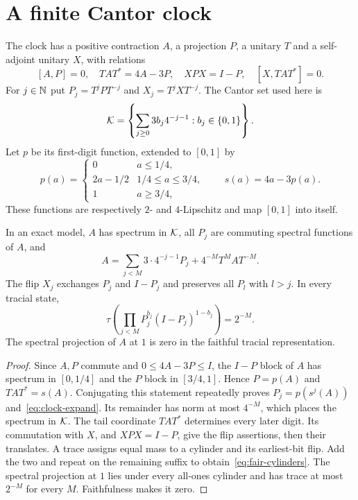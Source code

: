 \section{A finite Cantor clock}\label{sec:clock}
The clock has a positive contraction $A$, a projection $P$, a unitary $T$ and a self-adjoint unitary $X$, with relations
\begin{equation}\label{eq:clock}
 [A,P]=0,\quad TAT^*=4A-3P,\quad XPX=I-P,\quad [X,TAT^*]=0.
\end{equation}
For $j\in\mathbb N$ put $P_j=T^jPT^{-j}$ and $X_j=T^jXT^{-j}$. The Cantor set used here is
\[
 \mathcal K=\left\{\sum_{j\ge0}3b_j4^{-j-1}:b_j\in\{0,1\}\right\}.
\]
Let $p$ be its first-digit function, extended to $[0,1]$ by
\[
 p(a)=\begin{cases}0&a\le1/4,\\2a-1/2&1/4\le a\le3/4,\\1&a\ge3/4,\end{cases}
 \qquad s(a)=4a-3p(a).
\]
These functions are respectively $2$- and $4$-Lipschitz and map $[0,1]$ into itself.

\begin{lemma}\label{lem:exact-clock}
In an exact model, $A$ has spectrum in $\mathcal K$, all $P_j$ are commuting spectral functions of $A$, and
\begin{equation}\label{eq:clock-expand}
 A=\sum_{j<M}3\cdot4^{-j-1}P_j+4^{-M}T^MAT^{-M}.
\end{equation}
The flip $X_j$ exchanges $P_j$ and $I-P_j$ and preserves all $P_l$ with $l>j$. In every tracial state,
\begin{equation}\label{eq:fair-cylinders}
 \tau\left(\prod_{j<M}P_j^{b_j}(I-P_j)^{1-b_j}\right)=2^{-M}.
\end{equation}
The spectral projection of $A$ at $1$ is zero in the faithful tracial representation.
\end{lemma}
\begin{proof}
Since $A,P$ commute and $0\le4A-3P\le I$, the $I-P$ block of $A$ has spectrum in $[0,1/4]$ and the $P$ block in $[3/4,1]$. Hence $P=p(A)$ and $TAT^*=s(A)$. Conjugating this statement repeatedly proves $P_j=p(s^j(A))$ and~\eqref{eq:clock-expand}. Its remainder has norm at most $4^{-M}$, which places the spectrum in $\mathcal K$. The tail coordinate $TAT^*$ determines every later digit. Its commutation with $X$, and $XPX=I-P$, give the flip assertions, then their translates. A trace assigns equal mass to a cylinder and its earliest-bit flip. Add the two and repeat on the remaining suffix to obtain~\eqref{eq:fair-cylinders}. The spectral projection at $1$ lies under every all-ones cylinder and has trace at most $2^{-M}$ for every $M$. Faithfulness makes it zero.
\end{proof}

